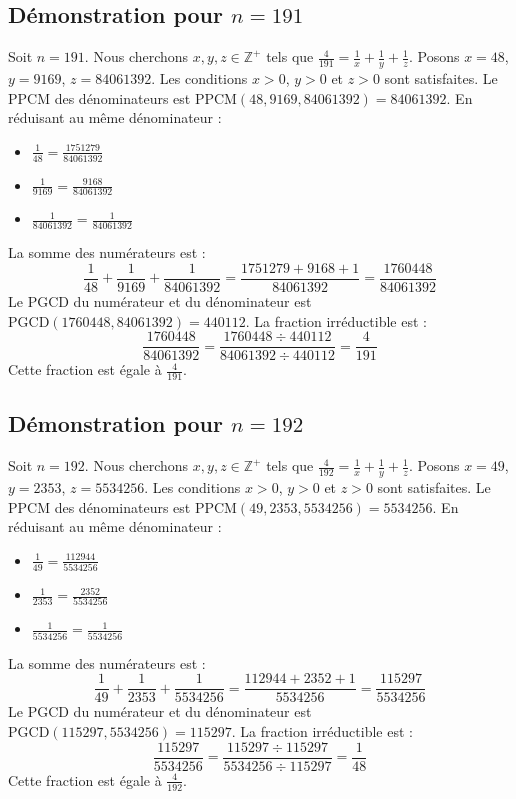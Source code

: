 \documentclass[11pt,a4paper]{article}
\begin{document}
\subsection{Démonstration pour $n = 191$}
Soit $n = 191$. Nous cherchons $x, y, z \in \mathbb{Z}^{+}$ tels que $\frac{4}{191} = \frac{1}{x} + \frac{1}{y} + \frac{1}{z}$.
Posons $x = 48$, $y = 9169$, $z = 84061392$.
Les conditions $x > 0$, $y > 0$ et $z > 0$ sont satisfaites.
Le PPCM des dénominateurs est $\text{PPCM}(48, 9169, 84061392) = 84061392$.
En réduisant au même dénominateur :
\begin{itemize}
    \item $\frac{1}{48} = \frac{1751279}{84061392}$
    \item $\frac{1}{9169} = \frac{9168}{84061392}$
    \item $\frac{1}{84061392} = \frac{1}{84061392}$
\end{itemize}
La somme des numérateurs est :
$$ \frac{1}{48} + \frac{1}{9169} + \frac{1}{84061392} = \frac{1751279 + 9168 + 1}{84061392} = \frac{1760448}{84061392} $$
Le PGCD du numérateur et du dénominateur est $\text{PGCD}(1760448, 84061392) = 440112$.
La fraction irréductible est :
$$ \frac{1760448}{84061392} = \frac{1760448 \div 440112}{84061392 \div 440112} = \frac{4}{191} $$
Cette fraction est égale à $\frac{4}{191}$.

\subsection{Démonstration pour $n = 192$}
Soit $n = 192$. Nous cherchons $x, y, z \in \mathbb{Z}^{+}$ tels que $\frac{4}{192} = \frac{1}{x} + \frac{1}{y} + \frac{1}{z}$.
Posons $x = 49$, $y = 2353$, $z = 5534256$.
Les conditions $x > 0$, $y > 0$ et $z > 0$ sont satisfaites.
Le PPCM des dénominateurs est $\text{PPCM}(49, 2353, 5534256) = 5534256$.
En réduisant au même dénominateur :
\begin{itemize}
    \item $\frac{1}{49} = \frac{112944}{5534256}$
    \item $\frac{1}{2353} = \frac{2352}{5534256}$
    \item $\frac{1}{5534256} = \frac{1}{5534256}$
\end{itemize}
La somme des numérateurs est :
$$ \frac{1}{49} + \frac{1}{2353} + \frac{1}{5534256} = \frac{112944 + 2352 + 1}{5534256} = \frac{115297}{5534256} $$
Le PGCD du numérateur et du dénominateur est $\text{PGCD}(115297, 5534256) = 115297$.
La fraction irréductible est :
$$ \frac{115297}{5534256} = \frac{115297 \div 115297}{5534256 \div 115297} = \frac{1}{48} $$
Cette fraction est égale à $\frac{4}{192}$.
\end{document}
